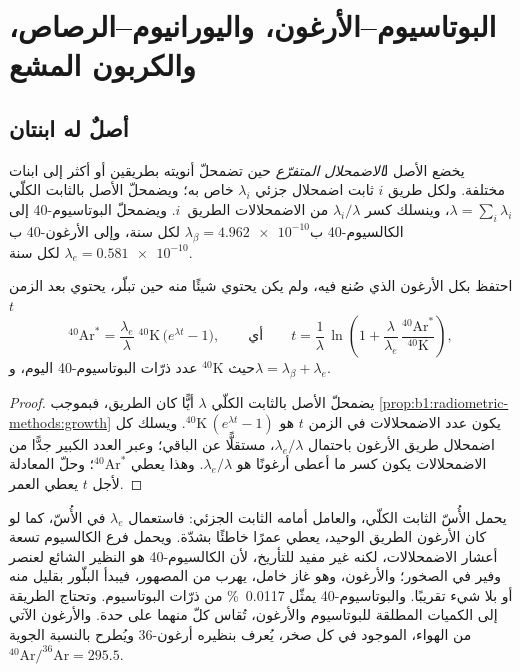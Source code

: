 \section{البوتاسيوم–الأرغون، واليورانيوم–الرصاص، والكربون المشع}\label{sec:b1:radiometric-methods:kar}

\subsection*{أصلٌ له ابنتان}

\begin{definition}\label{def:b1:radiometric-methods:branching}
يخضع الأصل ل\emph{الاضمحلال المتفرّع} حين تضمحلّ أنويته بطريقين أو أكثر إلى ابنات مختلفة. ولكل طريق $i$ ثابت اضمحلال جزئي $\lambda_i$ خاص به؛ ويضمحلّ الأصل بالثابت الكلّي $\lambda = \sum_i \lambda_i$، وينسلك كسر $\lambda_i/\lambda$ من الاضمحلالات الطريق~$i$. ويضمحلّ البوتاسيوم-40 إلى الكالسيوم-40 ب$\lambda_\beta =
\num{4.962e-10}$ لكل سنة، وإلى الأرغون-40 ب$\lambda_e = \num{0.581e-10}$ لكل سنة.
\end{definition}

\begin{proposition}\label{prop:b1:radiometric-methods:kar}
 احتفظ بكل الأرغون الذي صُنع فيه، ولم يكن يحتوي شيئًا منه حين تبلّر، يحتوي بعد الزمن $t$
\[
  {}^{40}\mathrm{Ar}^* = \frac{\lambda_e}{\lambda}\;{}^{40}\mathrm{K}\,\bigl(e^{\lambda t} - 1\bigr),
  \qquad\text{أي}\qquad
  t = \frac{1}{\lambda}\,\ln\!\left(1 + \frac{\lambda}{\lambda_e}\,
      \frac{{}^{40}\mathrm{Ar}^*}{{}^{40}\mathrm{K}}\right),
\]
حيث ${}^{40}\mathrm{K}$ عدد ذرّات البوتاسيوم-40 اليوم، و$\lambda =
\lambda_\beta + \lambda_e$.
\end{proposition}

\begin{proof}
يضمحلّ الأصل بالثابت الكلّي $\lambda$ أيًّا كان الطريق، فبموجب \cref{prop:b1:radiometric-methods:growth} يكون عدد الاضمحلالات في الزمن $t$ هو ${}^{40}\mathrm{K}\,(e^{\lambda t} - 1)$. ويسلك كل اضمحلال طريق الأرغون باحتمال $\lambda_e/\lambda$، مستقلًّا عن الباقي؛ وعبر العدد الكبير جدًّا من الاضمحلالات يكون كسر ما أعطى أرغونًا هو $\lambda_e/\lambda$. وهذا يعطي ${}^{40}\mathrm{Ar}^*$؛ وحلّ المعادلة لأجل $t$ يعطي العمر.
\end{proof}

يحمل الأُسّ الثابت الكلّي، والعامل أمامه الثابت الجزئي: فاستعمال $\lambda_e$ في الأُسّ، كما لو كان الأرغون الطريق الوحيد، يعطي عمرًا خاطئًا بشدّة. ويحمل فرع الكالسيوم تسعة أعشار الاضمحلالات، لكنه غير مفيد للتأريخ، لأن الكالسيوم-40 هو النظير الشائع لعنصر وفير في الصخور؛ والأرغون، وهو غاز خامل، يهرب من المصهور، فيبدأ البلّور بقليل منه أو بلا شيء تقريبًا. والبوتاسيوم-40 يمثّل \qty{0.0117}{\percent} من ذرّات البوتاسيوم. وتحتاج الطريقة إلى الكميات المطلقة للبوتاسيوم والأرغون، تُقاس كلّ منهما على حدة. والأرغون الآتي من الهواء، الموجود في كل صخر، يُعرف بنظيره أرغون-36 ويُطرح بالنسبة الجوية $^{40}\mathrm{Ar}/^{36}\mathrm{Ar} = 295.5$.

